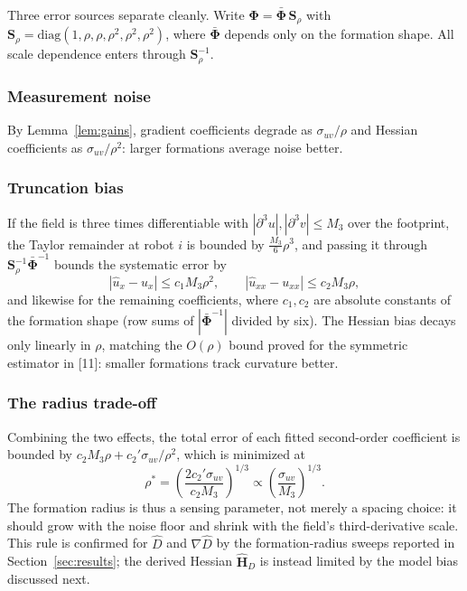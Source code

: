 \documentclass[lettersize,journal]{IEEEtran}
\begin{document}
Three error sources separate cleanly. Write $\boldsymbol{\Phi} =
\bar{\boldsymbol{\Phi}}\,\mathbf{S}_\rho$ with $\mathbf{S}_\rho =
\mathrm{diag}(1, \rho, \rho, \rho^2, \rho^2, \rho^2)$, where
$\bar{\boldsymbol{\Phi}}$ depends only on the formation shape. All
scale dependence enters through $\mathbf{S}_\rho^{-1}$.

\subsubsection{Measurement noise}
By Lemma~\ref{lem:gains}, gradient coefficients degrade as
$\sigma_{uv}/\rho$ and Hessian coefficients as $\sigma_{uv}/\rho^2$:
larger formations average noise better.

\subsubsection{Truncation bias}
If the field is three times differentiable with
$|\partial^3 u|, |\partial^3 v| \leq M_3$ over the footprint, the Taylor
remainder at robot $i$ is bounded by $\tfrac{M_3}{6}\rho^3$, and passing
it through $\mathbf{S}_\rho^{-1}\bar{\boldsymbol{\Phi}}^{-1}$ bounds the
systematic error by
\begin{equation}
    |\hat{u}_x - u_x| \leq c_1 M_3 \rho^2, \qquad
    |\hat{u}_{xx} - u_{xx}| \leq c_2 M_3 \rho,
    \label{eq:truncation}
\end{equation}
and likewise for the remaining coefficients, where $c_1, c_2$ are
absolute constants of the formation shape (row sums of
$|\bar{\boldsymbol{\Phi}}^{-1}|$ divided by six). The Hessian bias decays
only linearly in $\rho$, matching the $O(\rho)$ bound proved for the
symmetric estimator in [11]: smaller formations track curvature better.

\subsubsection{The radius trade-off}
Combining the two effects, the total error of each fitted second-order
coefficient is bounded by
$c_2 M_3 \rho + c_2' \sigma_{uv}/\rho^2$, which is minimized at
\begin{equation}
    \rho^* = \left(\frac{2 c_2' \sigma_{uv}}{c_2 M_3}\right)^{1/3}
    \propto \left(\frac{\sigma_{uv}}{M_3}\right)^{1/3}.
    \label{eq:rho_star}
\end{equation}
The formation radius is thus a sensing parameter, not merely a spacing
choice: it should grow with the noise floor and shrink with the field's
third-derivative scale. This rule is confirmed for $\hat{D}$ and
$\nabla\hat{D}$ by the formation-radius sweeps reported in
Section~\ref{sec:results}; the derived Hessian $\hat{\mathbf{H}}_D$ is
instead limited by the model bias discussed next.
\end{document}
